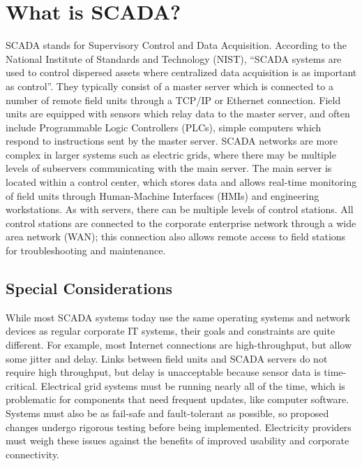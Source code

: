 \documentclass[10pt]{article}
\begin{document}
    \section{What is SCADA?}
    SCADA stands for Supervisory Control and Data Acquisition. According to the National Institute of Standards and Technology (NIST), ``SCADA systems are used to control dispersed assets where centralized data acquisition is as important as control''.\cite{nist_2-6} They typically consist of a master server which is connected to a number of remote field units through a TCP/IP or Ethernet connection. Field units are equipped with sensors which relay data to the master server, and often include Programmable Logic Controllers (PLCs), simple computers which respond to instructions sent by the master server.\cite{nist_2-4} SCADA networks are more complex in larger systems such as electric grids, where there may be multiple levels of subservers communicating with the main server. The main server is located within a control center, which stores data and allows real-time monitoring of field units through Human-Machine Interfaces (HMIs) and engineering workstations.\cite{nist_2-4} As with servers, there can be multiple levels of control stations. All control stations are connected to the corporate enterprise network through a wide area network (WAN); this connection also allows remote access to field stations for troubleshooting and maintenance.\cite{nist_2-7}
    
    \subsection{Special Considerations}
    While most SCADA systems today use the same operating systems and network devices as regular corporate IT systems, their goals and constraints are quite different.\cite{nist_3-1} For example, most Internet connections are high-throughput, but allow some jitter and delay. Links between field units and SCADA servers do not require high throughput, but delay is unacceptable because sensor data is time-critical.\cite{nist_3-1} Electrical grid systems must be running nearly all of the time, which is problematic for components that need frequent updates, like computer software. Systems must also be as fail-safe and fault-tolerant as possible, so proposed changes undergo rigorous testing before being implemented.\cite{nist_3-2} Electricity providers must weigh these issues against the benefits of improved usability and corporate connectivity.
    \medskip
    
\end{document}
